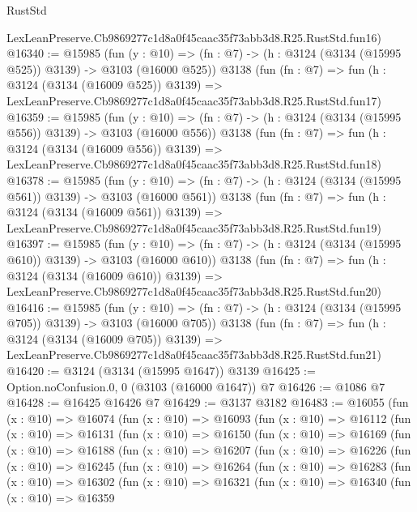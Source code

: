 \begin{lexlean}{RustStd}
\begin{coremodule}
    LexLeanPreserve.Cb9869277c1d8a0f45caac35f73abb3d8.R25.RustStd.fun16)
@16340 := @15985
    (fun (y : @10) => (fn : @7) -> (h : @3124 (@3134 (@15995 @525)) @3139) -> @3103 (@16000 @525))
    @3138
    (fun (fn : @7) =>
    fun (h : @3124 (@3134 (@16009 @525)) @3139) =>
    LexLeanPreserve.Cb9869277c1d8a0f45caac35f73abb3d8.R25.RustStd.fun17)
@16359 := @15985
    (fun (y : @10) => (fn : @7) -> (h : @3124 (@3134 (@15995 @556)) @3139) -> @3103 (@16000 @556))
    @3138
    (fun (fn : @7) =>
    fun (h : @3124 (@3134 (@16009 @556)) @3139) =>
    LexLeanPreserve.Cb9869277c1d8a0f45caac35f73abb3d8.R25.RustStd.fun18)
@16378 := @15985
    (fun (y : @10) => (fn : @7) -> (h : @3124 (@3134 (@15995 @561)) @3139) -> @3103 (@16000 @561))
    @3138
    (fun (fn : @7) =>
    fun (h : @3124 (@3134 (@16009 @561)) @3139) =>
    LexLeanPreserve.Cb9869277c1d8a0f45caac35f73abb3d8.R25.RustStd.fun19)
@16397 := @15985
    (fun (y : @10) => (fn : @7) -> (h : @3124 (@3134 (@15995 @610)) @3139) -> @3103 (@16000 @610))
    @3138
    (fun (fn : @7) =>
    fun (h : @3124 (@3134 (@16009 @610)) @3139) =>
    LexLeanPreserve.Cb9869277c1d8a0f45caac35f73abb3d8.R25.RustStd.fun20)
@16416 := @15985
    (fun (y : @10) => (fn : @7) -> (h : @3124 (@3134 (@15995 @705)) @3139) -> @3103 (@16000 @705))
    @3138
    (fun (fn : @7) =>
    fun (h : @3124 (@3134 (@16009 @705)) @3139) =>
    LexLeanPreserve.Cb9869277c1d8a0f45caac35f73abb3d8.R25.RustStd.fun21)
@16420 := @3124 (@3134 (@15995 @1647)) @3139
@16425 := Option.noConfusion.{0, 0} (@3103 (@16000 @1647)) @7
@16426 := @1086 @7
@16428 := @16425 @16426 @7
@16429 := @3137 @3182
@16483 := @16055
    (fun (x : @10) =>
    @16074
      (fun (x : @10) =>
      @16093
        (fun (x : @10) =>
        @16112
          (fun (x : @10) =>
          @16131
            (fun (x : @10) =>
            @16150
              (fun (x : @10) =>
              @16169
                (fun (x : @10) =>
                @16188
                  (fun (x : @10) =>
                  @16207
                    (fun (x : @10) =>
                    @16226
                      (fun (x : @10) =>
                      @16245
                        (fun (x : @10) =>
                        @16264
                          (fun (x : @10) =>
                          @16283
                            (fun (x : @10) =>
                            @16302
                              (fun (x : @10) =>
                              @16321
                                (fun (x : @10) =>
                                @16340
                                  (fun (x : @10) =>
                                  @16359

\end{coremodule}
\end{lexlean}
